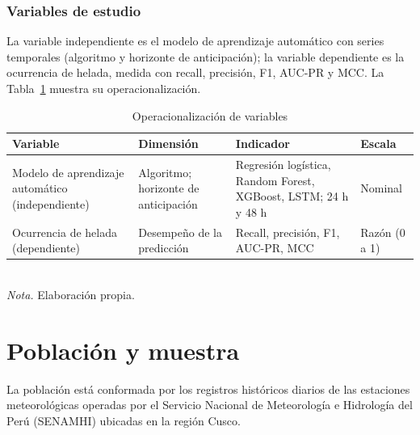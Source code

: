 \subsubsection{Variables de estudio}
La variable independiente es el modelo de aprendizaje automático con series temporales (algoritmo y horizonte de anticipación); la variable dependiente es la ocurrencia de helada, medida con recall, precisión, F1, AUC-PR y MCC. La Tabla~\ref{tab:operacionalizacion} muestra su operacionalización.

\begin{table}[ht]
\centering
\caption{Operacionalización de variables}
\label{tab:operacionalizacion}
\begin{tabular}{@{}p{3cm}p{3.2cm}p{5.2cm}p{3.2cm}@{}}
\toprule
\textbf{Variable} & \textbf{Dimensión} & \textbf{Indicador} & \textbf{Escala} \\
\midrule
Modelo de aprendizaje automático (independiente) & Algoritmo; horizonte de anticipación & Regresión logística, Random Forest, XGBoost, LSTM; 24 h y 48 h & Nominal \\
Ocurrencia de helada (dependiente) & Desempeño de la predicción & Recall, precisión, F1, AUC-PR, MCC & Razón (0 a 1) \\
\bottomrule
\end{tabular}\\
\textit{Nota.} Elaboración propia.
\end{table}

\section{Población y muestra}
La población está conformada por los registros históricos diarios de las estaciones meteorológicas operadas por el Servicio Nacional de Meteorología e Hidrología del Perú (SENAMHI) ubicadas en la región Cusco. 

